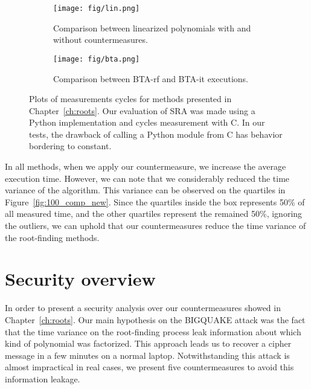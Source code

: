 \begin{figure}[ht]

\begin{subfigure}{0.48\textwidth}
  \centering
  \texttt{[image: fig/lin.png]}
  \caption{Comparison between linearized polynomials with and without countermeasures.}
  \label{fig:slin}
\end{subfigure}
\begin{subfigure}{0.48\textwidth}
  \centering
  \texttt{[image: fig/bta.png]}
  \caption{Comparison between BTA-rf and BTA-it executions.}
  \label{fig:sbta}
\end{subfigure}

\caption{Plots of measurements cycles for methods presented in Chapter~\ref{ch:roots}. Our evaluation of SRA was made using a Python implementation and cycles measurement with C. In our tests, the drawback of calling a Python module from C has behavior bordering to constant.}
\label{fig:55-60-100}
\end{figure}



In all methods, when we apply our countermeasure, we increase the average execution time. However, we can note that we considerably reduced the time variance of the algorithm. This variance can be observed on the quartiles in Figure~\ref{fig:100_comp_new}. Since the quartiles inside the box represents 50\% of all measured time, and the other quartiles represent the remained 50\%, ignoring the outliers, we can uphold that our countermeasures reduce the time variance of the root-finding methods.

\section{Security overview}
In order to present a security analysis over our countermeasures showed in Chapter~\ref{ch:roots}. Our main hypothesis on the BIGQUAKE attack was the fact that the time variance on the root-finding process leak information about which kind of polynomial was factorized. This approach leads us to recover a cipher message in a few minutes on a normal laptop. Notwithstanding this attack is almost impractical in real cases, we present five countermeasures to avoid this information leakage.

